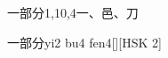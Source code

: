 \begin{entry}{一部分}{1,10,4}{⼀、⾢、⼑}
  \begin{phonetics}{一部分}{yi2 bu4 fen4}[][HSK 2]
  \end{phonetics}
\end{entry}
